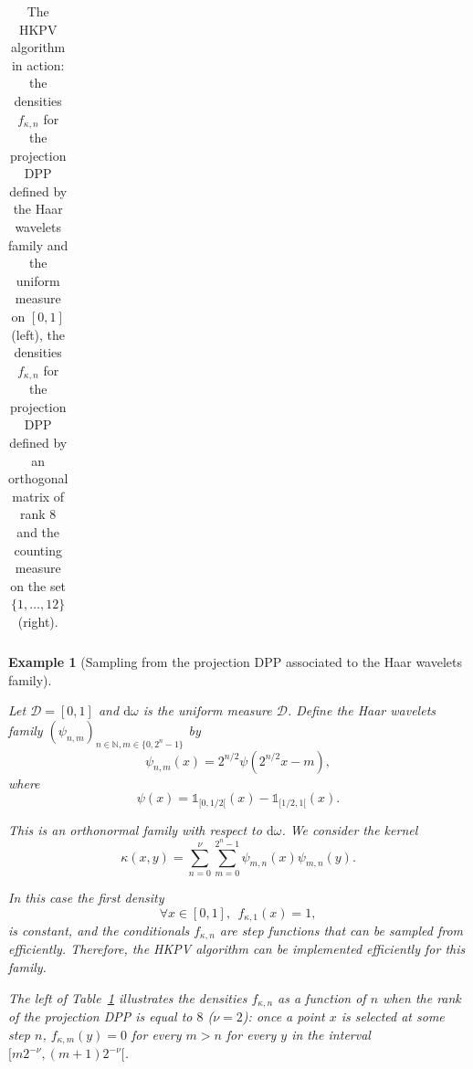 \documentclass[twoside,11pt]{book}
\newtheorem{example}{Example}
\numberwithin{theorem}{chapter}
\numberwithin{definition}{chapter}
\numberwithin{proposition}{chapter}
\numberwithin{corollary}{chapter}
\numberwithin{example}{chapter}
\numberwithin{lemma}{chapter}
\numberwithin{assumption}{chapter}
\numberwithin{equation}{chapter}
\numberwithin{figure}{chapter}
\begin{document}
\begin{table}[]
\begin{tabular}{| c| c| c|}
\hline
\end{tabular}
\caption{The HKPV algorithm in action: the densities $f_{\kappa,n}$ for the projection DPP defined by the Haar wavelets family and the uniform measure on $[0,1]$(left), the densities $f_{\kappa,n}$ for the projection DPP defined by an orthogonal matrix of rank $8$ and the counting measure on the set $\{ 1, \dots, 12 \}$ (right).\label{table:HKPV_figures}}
\end{table}



\begin{example}[Sampling from the projection DPP associated to the Haar wavelets family]\label{ex:dpp_chapter_haar_family}

Let $\mathcal{D} = [0,1]$ and $\mathrm{d}\omega$ is the uniform measure $\mathcal{D}$. Define the Haar wavelets family $(\psi_{n,m})_{n \in \mathbb{N}, m \in \{0,2^{n}-1\}}$ by
\begin{equation}
\psi_{n,m}(x) = 2^{n/2}\psi(2^{n/2}x - m),
\end{equation}
where
\begin{equation}
\psi(x) = \mathbb{1}_{[0,1/2[}(x) - \mathbb{1}_{[1/2,1[}(x).
\end{equation}

This is an orthonormal family with respect to $\mathrm{d}\omega$. We consider the kernel
\begin{equation}
\kappa(x,y) = \sum\limits_{n = 0}^{\nu}\sum\limits_{m=0}^{2^n-1} \psi_{m,n}(x)\psi_{m,n}(y).
\end{equation}

In this case the first density 
\begin{equation}
\forall x \in [0,1], \:\:f_{\kappa,1}(x) = 1,
\end{equation}
is constant, and the conditionals $f_{\kappa,n}$ are step functions that can be sampled from efficiently. Therefore, the HKPV algorithm can be implemented efficiently for this family.


The left of Table~\ref{table:HKPV_figures} illustrates the  densities $f_{\kappa,n}$ as a function of $n$ when the rank of the projection DPP is equal to $8$ ($\nu = 2$): once a point $x$ is selected at some step $n$, $f_{\kappa,m}(y) = 0$ for every $m>n$ for every $y$ in the interval $[m2^{-\nu},(m+1)2^{-\nu}[$.

 \end{example}
\end{document}
